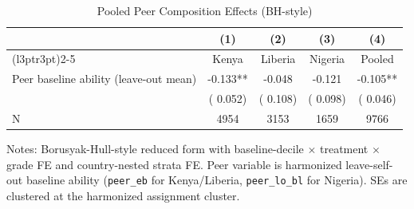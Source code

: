 \begin{table}[!htbp]
\centering
\caption{Pooled Peer Composition Effects (BH-style)}
\label{tab:pooled_peer_effects}
\begin{threeparttable}
\begin{tabular}[t]{lcccc}
\toprule
 & (1) & (2) & (3) & (4) \\
\cmidrule(l{3pt}r{3pt}){2-5}
 & Kenya & Liberia & Nigeria & Pooled \\
\midrule
Peer baseline ability (leave-out mean) &  -0.133** &  -0.048 &  -0.121 &  -0.105** \\
 & (  0.052) & (  0.108) & (  0.098) & (  0.046) \\
\addlinespace
N & 4954 & 3153 & 1659 & 9766 \\
\bottomrule
\end{tabular}
\begin{tablenotes}[para]
\item Notes: Borusyak-Hull-style reduced form with baseline-decile $\times$ treatment $\times$ grade FE and country-nested strata FE. 
Peer variable is harmonized leave-self-out baseline ability (\texttt{peer\_eb} for Kenya/Liberia, \texttt{peer\_lo\_bl} for Nigeria). SEs are clustered at the harmonized assignment cluster.
\end{tablenotes}
\end{threeparttable}
\end{table}
